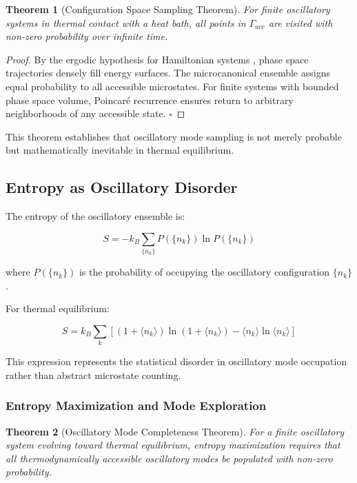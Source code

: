 \documentclass[11pt]{article}
\newtheorem{theorem}{Theorem}[section]
\theoremstyle{remark}
\begin{document}
\begin{theorem}[Configuration Space Sampling Theorem]
For finite oscillatory systems in thermal contact with a heat bath, all points in $\Gamma_{acc}$ are visited with non-zero probability over infinite time.
\end{theorem}

\begin{proof}
By the ergodic hypothesis for Hamiltonian systems \cite{pathria2011statistical}, phase space trajectories densely fill energy surfaces. The microcanonical ensemble assigns equal probability to all accessible microstates. For finite systems with bounded phase space volume, Poincaré recurrence ensures return to arbitrary neighborhoods of any accessible state. $\square$
\end{proof}

This theorem establishes that oscillatory mode sampling is not merely probable but mathematically inevitable in thermal equilibrium.

\subsection{Entropy as Oscillatory Disorder}

The entropy of the oscillatory ensemble is:

$$S = -k_B \sum_{\{n_k\}} P(\{n_k\}) \ln P(\{n_k\})$$

where $P(\{n_k\})$ is the probability of occupying the oscillatory configuration $\{n_k\}$.

For thermal equilibrium:

$$S = k_B \sum_k \left[(1 + \langle n_k\rangle)\ln(1 + \langle n_k\rangle) - \langle n_k\rangle\ln\langle n_k\rangle\right]$$

This expression represents the statistical disorder in oscillatory mode occupation rather than abstract microstate counting.

\subsubsection{Entropy Maximization and Mode Exploration}

\begin{theorem}[Oscillatory Mode Completeness Theorem]
For a finite oscillatory system evolving toward thermal equilibrium, entropy maximization requires that all thermodynamically accessible oscillatory modes be populated with non-zero probability.
\end{theorem}
\end{document}
